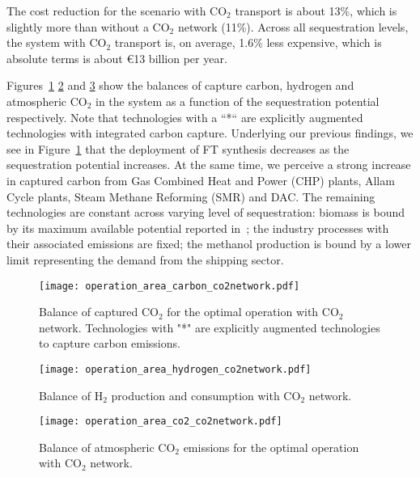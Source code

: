 \documentclass[conference]{IEEEtran}
\newcommand{\carbon}{CO$_2$ }
\begin{document}
The cost reduction for the scenario with \carbon transport is about 13\%, which is slightly more than without a \carbon network (11\%). Across all sequestration levels, the system with \carbon transport is, on average, 1.6\% less expensive, which is absolute terms is about €13 billion per year.


Figures~\ref{fig:operation_area_carbon_co2network} \ref{fig:operation_area_hydrogen_co2network} and \ref{fig:operation_area_co2_co2network} show the balances of capture carbon, hydrogen and atmospheric \carbon in the system as a function of the sequestration potential respectively.
Note that technologies with a ``*`` are explicitly augmented technologies with integrated carbon capture. Underlying our previous findings, we see in Figure~\ref{fig:operation_area_carbon_co2network} that the deployment of FT synthesis decreases as the sequestration potential increases. At the same time, we perceive a strong increase in captured carbon from Gas Combined Heat and Power (CHP) plants, Allam Cycle plants, Steam Methane Reforming (SMR) and DAC. The remaining technologies are constant across varying level of sequestration: biomass is bound by its maximum available potential reported in~\cite{europeancommissionjointresearchcentreENSPRESOBIOMASS2019}; the industry processes with their associated emissions are fixed; the methanol production is bound by a lower limit representing the demand from the shipping sector.

\begin{figure}
    \centering
    \texttt{[image: operation\_area\_carbon\_co2network.pdf]}
    \caption{Balance of captured \carbon for the optimal operation with \carbon network. Technologies with "*" are explicitly augmented technologies to capture carbon emissions.}
    \label{fig:operation_area_carbon_co2network}
\end{figure}

\begin{figure}
    \centering
    \texttt{[image: operation\_area\_hydrogen\_co2network.pdf]}
    \caption{Balance of H$_2$ production and consumption with \carbon network.}
    \label{fig:operation_area_hydrogen_co2network}
\end{figure}

\begin{figure}
    \centering
    \texttt{[image: operation\_area\_co2\_co2network.pdf]}
    \caption{Balance of atmospheric \carbon emissions for the optimal operation with \carbon network.}
    \label{fig:operation_area_co2_co2network}
\end{figure}
\end{document}
